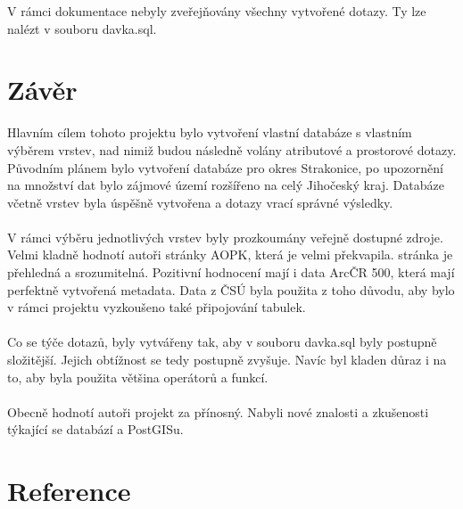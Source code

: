 \documentclass[a4paper, 12pt]{article}
\begin{document}
V rámci dokumentace nebyly zveřejňovány všechny vytvořené dotazy. Ty lze nalézt v souboru davka.sql. 


\clearpage
\section{Závěr}
Hlavním cílem tohoto projektu bylo vytvoření vlastní databáze s vlastním výběrem vrstev, nad nimiž budou následně volány atributové a prostorové dotazy. Původním plánem bylo vytvoření databáze pro okres Strakonice, po upozornění na množství dat bylo zájmové území rozšířeno na celý Jihočeský kraj. Databáze včetně vrstev byla úspěšně vytvořena a dotazy vrací správné výsledky.\\
\\
V rámci výběru jednotlivých vrstev byly prozkoumány veřejně dostupné zdroje. Velmi kladně hodnotí autoři stránky AOPK, která je velmi překvapila. stránka je přehledná a srozumitelná. Pozitivní hodnocení mají i data ArcČR 500, která mají perfektně vytvořená metadata. Data z ČSÚ byla použita z toho důvodu, aby bylo v rámci projektu vyzkoušeno také připojování tabulek. \\
\\
Co se týče dotazů, byly vytvářeny tak, aby v souboru davka.sql byly postupně složitější. Jejich obtížnost se tedy postupně zvyšuje. Navíc byl kladen důraz i na to, aby byla použita většina operátorů a funkcí. \\
\\
Obecně hodnotí autoři projekt za přínosný. Nabyli nové znalosti a zkušenosti týkající se databází a PostGISu. 




\clearpage
\section{Reference}
\end{document}
